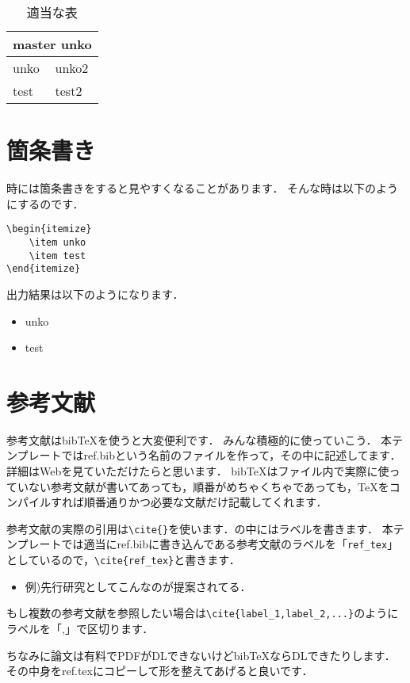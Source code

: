 \begin{table}[htbp]
  \centering
  \caption{適当な表}
    \begin{tabular}{l|l}
    \multicolumn{2}{c}{master unko} \\ \hline
    unko & unko2 \\
    test & test2 \\
    \end{tabular}
  \label{tab_addlabel}
\end{table}

\section{箇条書き}

時には箇条書きをすると見やすくなることがあります．
そんな時は以下のようにするのです．

\begin{verbatim}
\begin{itemize}
    \item unko
    \item test
\end{itemize}
\end{verbatim}

出力結果は以下のようになります．
\begin{itemize}
    \item unko
    \item test
\end{itemize}

\section{参考文献}

参考文献はbibTeXを使うと大変便利です．
みんな積極的に使っていこう．
本テンプレートではref.bibという名前のファイルを作って，その中に記述してます．
詳細はWebを見ていただけたらと思います．
bibTeXはファイル内で実際に使っていない参考文献が書いてあっても，順番がめちゃくちゃであっても，TeXをコンパイルすれば順番通りかつ必要な文献だけ記載してくれます．

参考文献の実際の引用は\verb|\cite{}|を使います．{}の中にはラベルを書きます．
本テンプレートでは適当にref.bibに書き込んである参考文献のラベルを「\verb|ref_tex|」としているので，\verb|\cite{ref_tex}|と書きます．
\begin{itemize}
    \item 例)先行研究としてこんなのが提案されてる\cite{ref_tex}．
\end{itemize}
もし複数の参考文献を参照したい場合は\verb|\cite{label_1,label_2,...}|のようにラベルを「,」で区切ります．

ちなみに論文は有料でPDFがDLできないけどbibTeXならDLできたりします．
その中身をref.texにコピーして形を整えてあげると良いです．
